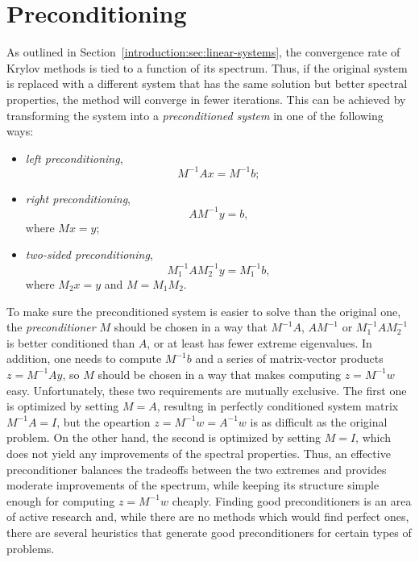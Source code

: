 \section{Preconditioning}

As outlined in Section~\ref{introduction:sec:linear-systems}, the convergence
rate of Krylov methods is tied to a function of its spectrum. Thus, if the
original system is replaced with a different system that has the same solution
but better spectral properties, the method will converge in fewer iterations.
This can be achieved by transforming the system into a \emph{preconditioned
system} in one of the following ways:
\begin{itemize}
\item \emph{left preconditioning},
\begin{equation}
    M^{-1}Ax = M^{-1}b;
\end{equation}
\item \emph{right preconditioning},
\begin{equation}
    AM^{-1}y = b,
\end{equation}
where $Mx = y$;
\item \emph{two-sided preconditioning},
\begin{equation}
    M_1^{-1}AM_2^{-1} y = M_1^{-1}b,
\end{equation}
where $M_2x = y$ and $M = M_1 M_2$.
\end{itemize}

To make sure the preconditioned system is easier to solve than the original one,
the \emph{preconditioner} $M$ should be chosen in a way that $M^{-1}A$,
$AM^{-1}$ or $M_1^{-1}AM_2^{-1}$ is better conditioned than $A$, or at least has
fewer extreme eigenvalues. In addition, one needs to compute $M^{-1}b$ and a
series of matrix-vector products $z = M^{-1}Ay$, so $M$ should be chosen in a
way that makes computing $z = M^{-1}w$ easy. Unfortunately, these two
requirements are mutually exclusive. The first one is optimized by setting
$M = A$, resultng in perfectly conditioned system matrix $M^{-1}A = I$, but
the opeartion $z = M^{-1}w = A^{-1}w$ is as difficult as the original problem.
On the other hand, the second is optimized by setting $M = I$, which does
not yield any improvements of the spectral properties. Thus, an effective
preconditioner balances the tradeoffs between the two extremes and provides
moderate improvements of the spectrum, while keeping its structure simple enough
for computing $z = M^{-1}w$ cheaply. Finding good preconditioners is an area of
active research and, while there are no methods which would find perfect ones,
there are several heuristics that generate good preconditioners for certain
types of problems.

